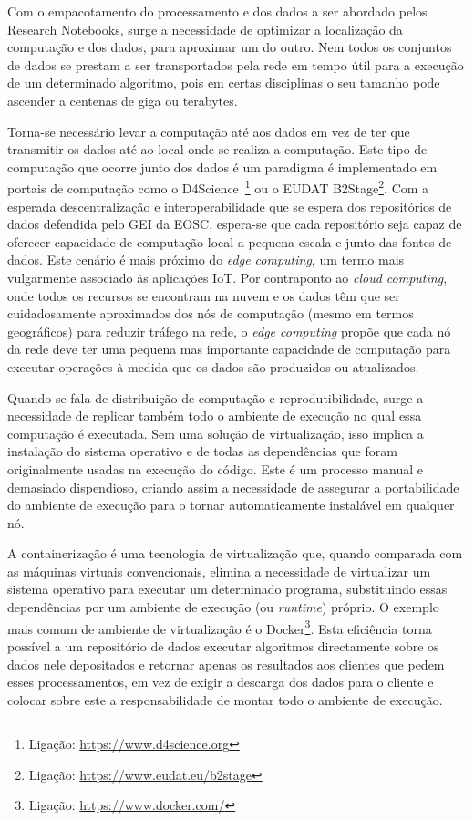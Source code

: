 \documentclass[sigconf,nonacm]{acmart}
\begin{document}
Com o empacotamento do processamento e dos dados a ser abordado pelos Research Notebooks, surge a necessidade de optimizar a localização da computação e dos dados, para aproximar um do outro. Nem todos os conjuntos de dados se prestam a ser transportados pela rede em tempo útil para a execução de um determinado algoritmo, pois em certas disciplinas o seu tamanho pode ascender a centenas de giga ou terabytes.

Torna-se necessário levar a computação até aos dados em vez de ter que transmitir os dados até ao local onde se realiza a computação. Este tipo de computação que ocorre junto dos dados é um paradigma é implementado em portais de computação como o D4Science~\footnote{Ligação: \url{https://www.d4science.org}} ou o EUDAT B2Stage\footnote{Ligação: \url{https://www.eudat.eu/b2stage}}. Com a esperada descentralização e interoperabilidade que se espera dos repositórios de dados defendida pelo \gls{GEI} da \gls{EOSC}, espera-se que cada repositório seja capaz de oferecer capacidade de computação local a pequena escala e junto das fontes de dados. Este cenário é mais próximo do \emph{edge computing}, um termo mais vulgarmente associado às aplicações \gls{IoT}. Por contraponto ao \emph{cloud computing}, onde todos os recursos se encontram na nuvem e os dados têm que ser cuidadosamente aproximados dos nós de computação (mesmo em termos geográficos) para reduzir tráfego na rede, o \emph{edge computing} propõe que cada nó da rede deve ter uma pequena mas importante capacidade de computação para executar operações à medida que os dados são produzidos ou atualizados.

Quando se fala de distribuição de computação e reprodutibilidade, surge a necessidade de replicar também todo o ambiente de execução no qual essa computação é executada. Sem uma solução de virtualização, isso implica a instalação do sistema operativo e de todas as dependências que foram originalmente usadas na execução do código. Este é um processo manual e demasiado dispendioso, criando assim a necessidade de assegurar a portabilidade do ambiente de execução para o tornar automaticamente instalável em qualquer nó.

A containerização é uma tecnologia de virtualização que, quando comparada com as máquinas virtuais convencionais, elimina a necessidade de virtualizar um sistema operativo para executar um determinado programa, substituindo essas dependências por um ambiente de execução (ou \textit{runtime}) próprio. O exemplo mais comum de ambiente de virtualização é o Docker\footnote{Ligação: \url{https://www.docker.com/}}. Esta eficiência torna possível a um repositório de dados executar algoritmos directamente sobre os dados nele depositados e retornar apenas os resultados aos clientes que pedem esses processamentos, em vez de exigir a descarga dos dados para o cliente e colocar sobre este a responsabilidade de montar todo o ambiente de execução.
\end{document}
